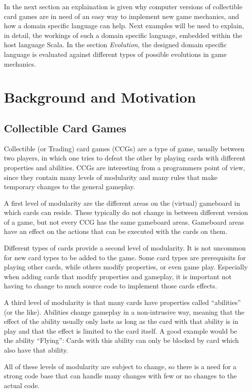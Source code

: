 \documentclass[twocolumn]{phdsymp}
\begin{document}
In the next section an explaination is given why computer versions of collectible card games are in need of an easy way to implement new game mechanics, and how a domain specific language can help. Next examples will be used to explain, in detail, the workings of such a domain specific language, embedded within the host language Scala. In the section \textit{Evolution}, the designed domain specific language is evaluated against different types of possible evolutions in game mechanics.
\section{Background and Motivation}
\subsection{Collectible Card Games}
Collectible (or Trading) card games (CCGs) are a type of game, usually between two players, in which one tries to defeat the other by playing cards with different properties and abilities. CCGs are interesting from a programmers point of view, since they contain many levels of modularity and many rules that make temporary changes to the general gameplay.

A first level of modularity are the different areas on the (virtual) gameboard in which cards can reside. These typically do not change in between different version of a game, but not every CCG has the same gameboard areas. Gameboard areas have an effect on the actions that can be executed with the cards on them.

Different types of cards provide a second level of modularity. It is not uncommon for new card types to be added to the game. Some card types are prerequisits for playing other cards, while others modify properties, or even game play. Especially when adding cards that modify properties and gameplay, it is important not having to change to much source code to implement those cards effects.

A third level of modularity is that many cards have properties called ``abilities'' (or the like). Abilities change gameplay in a non-intrusive way, meaning that the effect of the ability usually only lasts as long as the card with that ability is in play and that the effect is limited to the card itself. A good example would be the ability ``Flying'': Cards with this ability can only be blocked by card which also have that ability.

All of these levels of modularity are subject to change, so there is a need for a strong code base that can handle many changes with few or no changes to the actual code.
\end{document}
